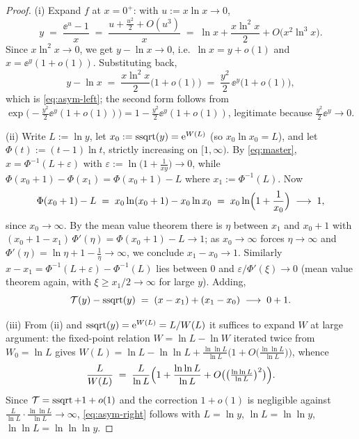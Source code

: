 \begin{proof}
(i) Expand $f$ at $x = 0^{+}$: with $u := x \ln x \to 0$,
\[
    y \;=\; \frac{\ee^{u} - 1}{x}
    \;=\; \frac{u + \tfrac{u^{2}}{2} + O(u^{3})}{x}
    \;=\; \ln x + \frac{x\ln^{2} x}{2} + O\bigl(x^{2}\ln^{3}x\bigr) .
\]
Since $x \ln^{2} x \to 0$, we get $y - \ln x \to 0$, i.e.\
$\ln x = y + o(1)$ and $x = \ee^{y}(1 + o(1))$. Substituting back,
\[
    y - \ln x \;=\; \frac{x \ln^{2} x}{2}\bigl(1 + o(1)\bigr)
    \;=\; \frac{y^{2}}{2}\,\ee^{y}\bigl(1 + o(1)\bigr),
\]
which is \eqref{eq:asym-left}; the second form follows from
$\exp\bigl(-\tfrac{y^{2}}{2}\ee^{y}(1+o(1))\bigr) =
1 - \tfrac{y^{2}}{2}\ee^{y}(1+o(1))$, legitimate because
$\tfrac{y^{2}}{2}\ee^{y} \to 0$.

(ii) Write $L := \ln y$, let $x_{0} := \operatorname{ssqrt}(y) = \mathrm{e}^{W(L)}$ (so
$x_{0}\ln x_{0} = L$), and let $\Phi(t) := (t-1)\ln t$, strictly
increasing on $[1, \infty)$. By \eqref{eq:master}, $x =
\Phi^{-1}(L + \varepsilon)$ with
$\varepsilon := \ln\bigl(1 + \tfrac{1}{xy}\bigr) \to 0$, while
$\Phi(x_{0} + 1) - \Phi(x_{1}) = \Phi(x_{0}+1) - L$ where $x_{1} :=
\Phi^{-1}(L)$. Now
\[
    \Phi(x_{0}+1) - L \;=\; x_{0}\ln(x_{0}+1) - x_{0}\ln x_{0}
    \;=\; x_{0}\ln\Bigl(1 + \frac{1}{x_{0}}\Bigr) \;\longrightarrow\; 1,
\]
since $x_{0} \to \infty$. By the mean value theorem there is
$\eta$ between $x_{1}$ and $x_{0}+1$ with
$(x_{0} + 1 - x_{1})\,\Phi'(\eta) = \Phi(x_{0}+1) - L \to 1$; as
$x_{0} \to \infty$ forces $\eta \to \infty$ and
$\Phi'(\eta) = \ln\eta + 1 - \tfrac1\eta \to \infty$, we conclude
$x_{1} - x_{0} \to 1$. Similarly $x - x_{1} = \Phi^{-1}(L+\varepsilon)
- \Phi^{-1}(L)$ lies between $0$ and
$\varepsilon/\Phi'(\xi) \to 0$ (mean value theorem again, with
$\xi \ge x_{1}/2 \to \infty$ for large $y$). Adding,
\[
    \mathcal{T}(y) - \operatorname{ssqrt}(y) \;=\; (x - x_{1}) + (x_{1} - x_{0})
    \;\longrightarrow\; 0 + 1 .
\]

(iii) From (ii) and $\operatorname{ssqrt}(y) = \mathrm{e}^{W(L)} = L/W(L)$ it suffices to
expand $W$ at large argument: the fixed-point relation
$W = \ln L - \ln W$ iterated twice from $W_{0} = \ln L$ gives
$W(L) = \ln L - \ln\ln L + \tfrac{\ln\ln L}{\ln L}\bigl(1 +
O\bigl(\tfrac{\ln\ln L}{\ln L}\bigr)\bigr)$, whence
\[
    \frac{L}{W(L)} \;=\; \frac{L}{\ln L}\Bigl( 1 +
    \frac{\ln\ln L}{\ln L} +
    O\bigl(\bigl(\tfrac{\ln\ln L}{\ln L}\bigr)^{2}\bigr) \Bigr).
\]
Since $\mathcal{T} = \operatorname{ssqrt} + 1 + o(1)$ and the correction
$1 + o(1)$ is negligible against
$\tfrac{L}{\ln L} \cdot \tfrac{\ln\ln L}{\ln L} \to \infty$,
\eqref{eq:asym-right} follows with $L = \ln y$,
$\ln L = \ln\ln y$, $\ln\ln L = \ln\ln\ln y$.
\end{proof}

